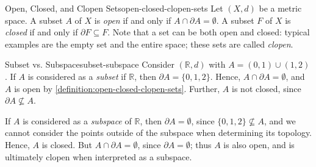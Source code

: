 \documentclass{article}
\numberwithin{equation}{section}
\numberwithin{figure}{section}
\begin{document}
\begin{definition}{Open, Closed, and Clopen Sets}{open-closed-clopen-sets}
    Let $ (X, d) $ be a metric space. A subset $ A $ of $ X $ is \emph{open} if
    and only if $ A \cap \partial A = \emptyset $. A subset $ F $ of $ X $ is
    \emph{closed} if and only if $ \partial F \subseteq F $. Note that a set can
    be both open and closed: typical examples are the empty set and the entire
    space; these sets are called \emph{clopen}.

    \centering
    \begin{minipage}{.5\linewidth}
        \centering
    \end{minipage}\hfill
    \begin{minipage}{.5\linewidth}
        \centering
    \end{minipage}
\end{definition}
\begin{example}{Subset vs. Subspace}{subset-subspace}
    Consider $ (\mathbb{R}, d) $ with $ A = (0, 1) \cup (1, 2) $. If $ A $ is
    considered as a \emph{subset} if $ \mathbb{R} $, then $ \partial A = \{0, 1,
    2 \} $. Hence, $ A \cap \partial A = \emptyset $, and $ A $ is open by
    \cref{definition:open-closed-clopen-sets}.  Further, $ A $ is not closed,
    since $ \partial A \not\subseteq A $.

    If $ A $ is considered as a \emph{subspace} of $ \mathbb{R} $, then $
    \partial A = \emptyset $, since $ \{ 0, 1, 2 \} \not\subseteq A $, and we
    cannot consider the points outside of the subspace when determining its
    topology. Hence, $ A $ is closed. But $ A \cap \partial A = \emptyset $,
    since $ \partial A = \emptyset $; thus $ A $ is also open, and is ultimately
    clopen when interpreted as a subspace.
\end{example}
\end{document}
